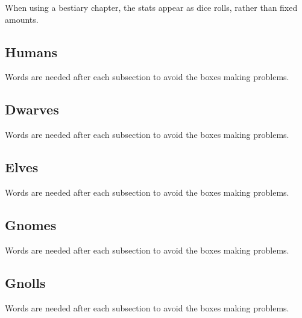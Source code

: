 \documentclass[a4paper,openany]{book}
\begin{document}
\begin{multicols}{2}


When using a bestiary chapter, the stats appear as dice rolls, rather than fixed amounts.

\subsection{Humans}
Words are needed after each subsection to avoid the boxes making problems.



\humanfarmer

\humansoldier

\sunguard

\humandiplomat

\doula

\humanbard

\humanthief

\humanalchemist

\humanalchemist

\necromancer

\subsection{Dwarves}
Words are needed after each subsection to avoid the boxes making problems.

\dwarvensoldier

\dwarventrader

\dwarvenrunemaster

\subsection{Elves}
Words are needed after each subsection to avoid the boxes making problems.



\elf

\elf

\elvenenchanter

\hag

\subsection{Gnomes}
Words are needed after each subsection to avoid the boxes making problems.



\gnome

\gnomishillusionist

\subsection{Gnolls}
Words are needed after each subsection to avoid the boxes making problems.



\gnollhunter

\gnollshaman

\gnollshaman

\end{multicols}
\end{document}

